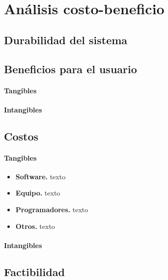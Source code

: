 \section{An\'{a}lisis costo-beneficio}
\subsection{Durabilidad del sistema}
\subsection{Beneficios para el usuario}
\paragraph{Tangibles}
\paragraph{Intangibles}

\subsection{Costos}
\paragraph{Tangibles}
\begin{itemize}
\item \textbf{Software.} texto
\item \textbf{Equipo.} texto
\item \textbf{Programadores.} texto
\item \textbf{Otros.} texto
\end{itemize}
\paragraph{Intangibles}

\subsection{Factibilidad}